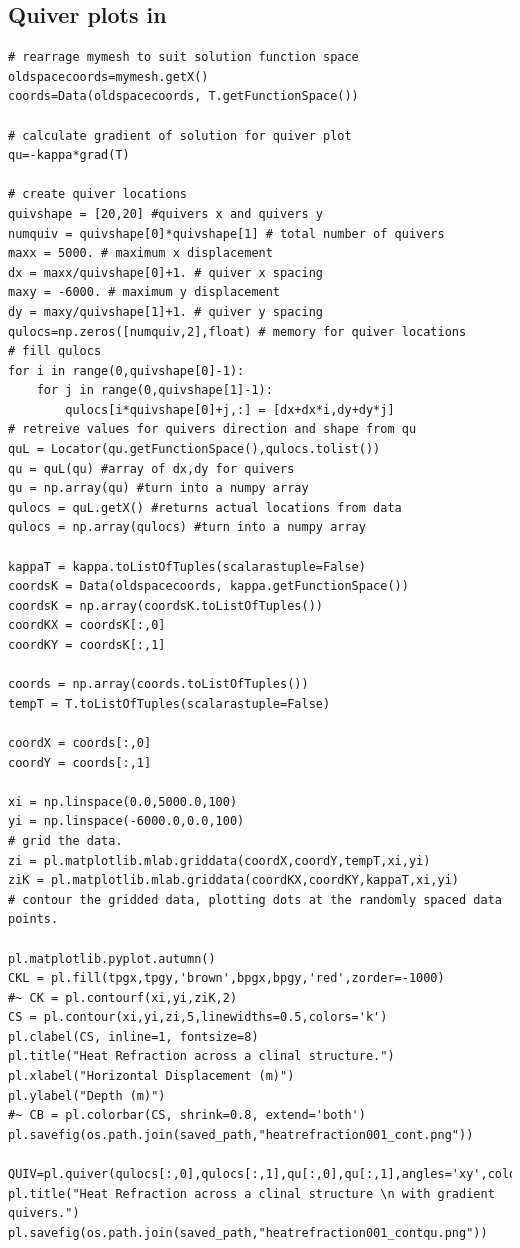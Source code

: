 \subsection{Quiver plots in \mpl}
\begin{verbatim}
# rearrage mymesh to suit solution function space      
oldspacecoords=mymesh.getX()
coords=Data(oldspacecoords, T.getFunctionSpace())

# calculate gradient of solution for quiver plot
qu=-kappa*grad(T)

# create quiver locations
quivshape = [20,20] #quivers x and quivers y
numquiv = quivshape[0]*quivshape[1] # total number of quivers
maxx = 5000. # maximum x displacement
dx = maxx/quivshape[0]+1. # quiver x spacing
maxy = -6000. # maximum y displacement
dy = maxy/quivshape[1]+1. # quiver y spacing
qulocs=np.zeros([numquiv,2],float) # memory for quiver locations
# fill qulocs
for i in range(0,quivshape[0]-1):
	for j in range(0,quivshape[1]-1):
		qulocs[i*quivshape[0]+j,:] = [dx+dx*i,dy+dy*j]
# retreive values for quivers direction and shape from qu
quL = Locator(qu.getFunctionSpace(),qulocs.tolist())
qu = quL(qu) #array of dx,dy for quivers
qu = np.array(qu) #turn into a numpy array
qulocs = quL.getX() #returns actual locations from data
qulocs = np.array(qulocs) #turn into a numpy array

kappaT = kappa.toListOfTuples(scalarastuple=False)
coordsK = Data(oldspacecoords, kappa.getFunctionSpace())
coordsK = np.array(coordsK.toListOfTuples())
coordKX = coordsK[:,0]
coordKY = coordsK[:,1]
      
coords = np.array(coords.toListOfTuples())
tempT = T.toListOfTuples(scalarastuple=False)

coordX = coords[:,0]
coordY = coords[:,1]

xi = np.linspace(0.0,5000.0,100)
yi = np.linspace(-6000.0,0.0,100)
# grid the data.
zi = pl.matplotlib.mlab.griddata(coordX,coordY,tempT,xi,yi)
ziK = pl.matplotlib.mlab.griddata(coordKX,coordKY,kappaT,xi,yi)
# contour the gridded data, plotting dots at the randomly spaced data points.

pl.matplotlib.pyplot.autumn()
CKL = pl.fill(tpgx,tpgy,'brown',bpgx,bpgy,'red',zorder=-1000)
#~ CK = pl.contourf(xi,yi,ziK,2)
CS = pl.contour(xi,yi,zi,5,linewidths=0.5,colors='k')
pl.clabel(CS, inline=1, fontsize=8)
pl.title("Heat Refraction across a clinal structure.")
pl.xlabel("Horizontal Displacement (m)")
pl.ylabel("Depth (m)")
#~ CB = pl.colorbar(CS, shrink=0.8, extend='both')
pl.savefig(os.path.join(saved_path,"heatrefraction001_cont.png"))

QUIV=pl.quiver(qulocs[:,0],qulocs[:,1],qu[:,0],qu[:,1],angles='xy',color="white")
pl.title("Heat Refraction across a clinal structure \n with gradient quivers.")
pl.savefig(os.path.join(saved_path,"heatrefraction001_contqu.png"))
\end{verbatim} 


